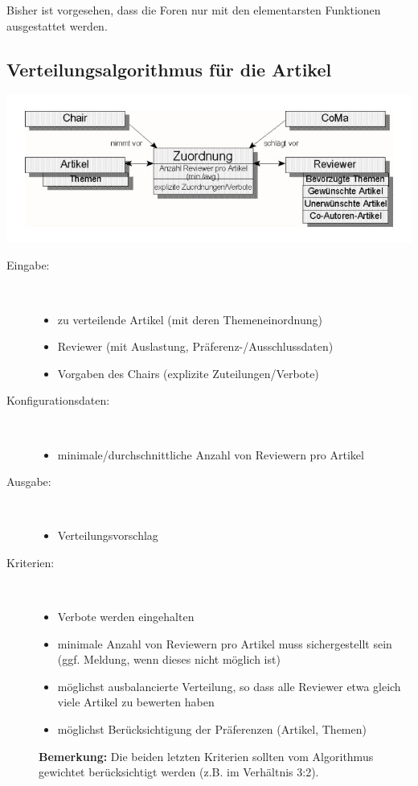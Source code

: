 \documentclass[headexclude,footexclude,12pt,BCOR0pt,DIV15]{scrartcl}
\begin{document}
            Bisher ist vorgesehen, dass die Foren nur mit den elementarsten Funktionen ausgestattet werden.

    \subsection{Verteilungsalgorithmus f\"{u}r die Artikel}
        \begin{center}\includegraphics[width=17cm]{verteilung1}\end{center}
        \begin{description}
            \item[Eingabe:] \
            \begin{itemize}
                \item zu verteilende Artikel (mit deren Themeneinordnung)
                \item Reviewer (mit Auslastung, Pr\"{a}ferenz-/Ausschlussdaten)
                \item Vorgaben des Chairs (explizite Zuteilungen/Verbote)
            \end{itemize}
            \item[Konfigurationsdaten:] \
            \begin{itemize}
                \item minimale/durchschnittliche Anzahl von Reviewern pro Artikel
            \end{itemize}
            \item[Ausgabe:] \
            \begin{itemize}
                \item Verteilungsvorschlag
            \end{itemize}
            \item[Kriterien:] \
            \begin{itemize}
                \item Verbote werden eingehalten
                \item minimale Anzahl von Reviewern pro Artikel muss sichergestellt sein
                      (ggf. Meldung, wenn dieses nicht m\"{o}glich ist)
                \item m\"{o}glichst ausbalancierte Verteilung, so dass alle Reviewer etwa gleich viele Artikel zu bewerten haben
                \item m\"{o}glichst Ber\"{u}cksichtigung der Pr\"{a}ferenzen (Artikel, Themen)
            \end{itemize}
            \textbf{Bemerkung:} Die beiden letzten Kriterien sollten vom Algorithmus gewichtet ber\"{u}cksichtigt werden
            (z.B. im Verh\"{a}ltnis 3:2).
        \end{description}
\end{document}
